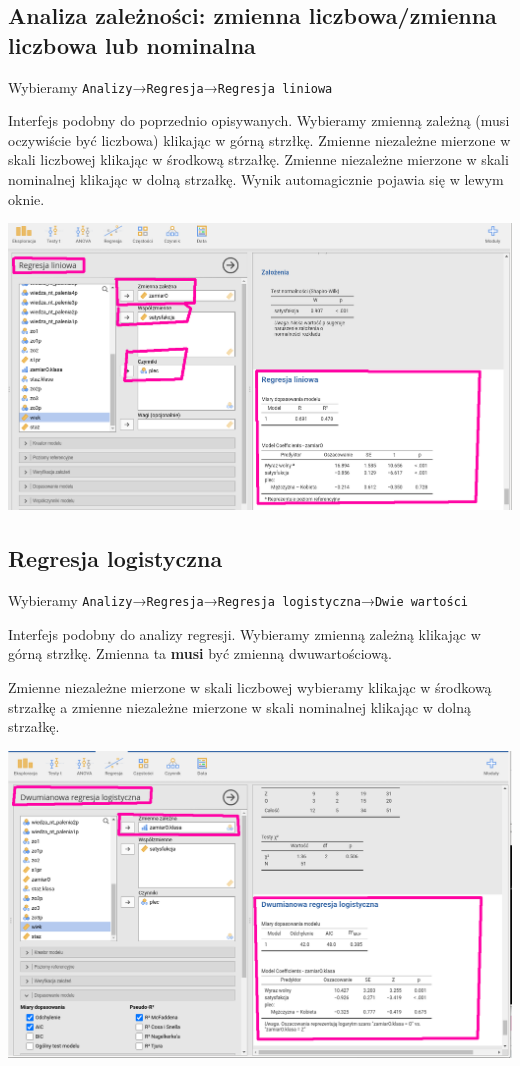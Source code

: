 \documentclass[
  openany]{book}
\begin{document}
\hypertarget{analiza-zaleux17cnoux15bci-zmienna-liczbowazmienna-liczbowa-lub-nominalna}{%
\subsection{Analiza zależności: zmienna liczbowa/zmienna liczbowa lub nominalna}\label{analiza-zaleux17cnoux15bci-zmienna-liczbowazmienna-liczbowa-lub-nominalna}}

Wybieramy \texttt{Analizy}→\texttt{Regresja}→\texttt{Regresja\ liniowa}

Interfejs podobny do poprzednio opisywanych. Wybieramy
zmienną zależną (musi oczywiście być liczbowa) klikając w górną strzłkę.
Zmienne niezależne mierzone w skali liczbowej
klikając w środkową strzałkę. Zmienne niezależne mierzone
w skali nominalnej klikając w dolną strzałkę.
Wynik automagicznie pojawia się w lewym oknie.

\includegraphics{./regresja_liniowa.png}

\hypertarget{regresja-logistyczna}{%
\subsection{Regresja logistyczna}\label{regresja-logistyczna}}

Wybieramy \texttt{Analizy}→\texttt{Regresja}→\texttt{Regresja\ logistyczna}→\texttt{Dwie\ wartości}

Interfejs podobny do analizy regresji. Wybieramy
zmienną zależną klikając w górną strzłkę. Zmienna ta
\textbf{musi} być zmienną dwuwartościową.

Zmienne niezależne mierzone w skali liczbowej
wybieramy klikając w środkową strzałkę a zmienne niezależne mierzone
w skali nominalnej klikając w dolną strzałkę.

\includegraphics{./regresja_logistyczna.png}
\end{document}
